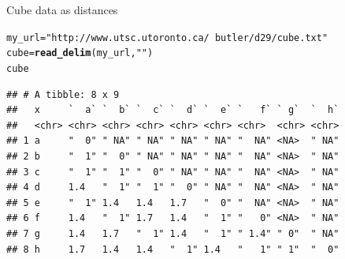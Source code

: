 \documentclass[unknownkeysallowed]{beamer}\usepackage[]{graphicx}\usepackage[]{color}
\makeatletter
\newcommand{\hlnum}[1]{\textcolor[rgb]{0.686,0.059,0.569}{#1}}%
\newcommand{\hlstr}[1]{\textcolor[rgb]{0.192,0.494,0.8}{#1}}%
\newcommand{\hlopt}[1]{\textcolor[rgb]{0,0,0}{#1}}%
\newcommand{\hlstd}[1]{\textcolor[rgb]{0.345,0.345,0.345}{#1}}%
\newcommand{\hlkwb}[1]{\textcolor[rgb]{0.69,0.353,0.396}{#1}}%
\newcommand{\hlkwd}[1]{\textcolor[rgb]{0.737,0.353,0.396}{\textbf{#1}}}%
\newenvironment{kframe}{%
 \def\at@end@of@kframe{}%
 \ifinner\ifhmode%
  \def\at@end@of@kframe{\end{minipage}}%
  \begin{minipage}{\columnwidth}%
 \fi\fi%
 \def\FrameCommand##1{\hskip\@totalleftmargin \hskip-\fboxsep
 \colorbox{shadecolor}{##1}\hskip-\fboxsep
     \hskip-\linewidth \hskip-\@totalleftmargin \hskip\columnwidth}%
 \MakeFramed {\advance\hsize-\width
   \@totalleftmargin\z@ \linewidth\hsize
   \@setminipage}}%
 {\par\unskip\endMakeFramed%
 \at@end@of@kframe}
\newenvironment{knitrout}{}{} %
\makeatother
\begin{document}
\begin{frame}[fragile]{Cube data as distances}
 
\begin{knitrout}\footnotesize
{}\color{fgcolor}\begin{kframe}
\begin{alltt}
\hlstd{my_url}\hlkwb{=}\hlstr{"http://www.utsc.utoronto.ca/~butler/d29/cube.txt"}
\hlstd{cube}\hlkwb{=}\hlkwd{read_delim}\hlstd{(my_url,}\hlstr{" "}\hlstd{)}
\hlstd{cube}
\end{alltt}
\begin{verbatim}
## # A tibble: 8 x 9
##   x     `  a` `  b` `  c` `  d` `  e` `   f` ` g`  `  h`
##   <chr> <chr> <chr> <chr> <chr> <chr> <chr>  <chr> <chr>
## 1 a     "  0" " NA" " NA" " NA" " NA" "  NA" <NA>  " NA"
## 2 b     "  1" "  0" " NA" " NA" " NA" "  NA" <NA>  " NA"
## 3 c     "  1" "  1" "  0" " NA" " NA" "  NA" <NA>  " NA"
## 4 d     1.4   "  1" "  1" "  0" " NA" "  NA" <NA>  " NA"
## 5 e     "  1" 1.4   1.4   1.7   "  0" "  NA" <NA>  " NA"
## 6 f     1.4   "  1" 1.7   1.4   "  1" "   0" <NA>  " NA"
## 7 g     1.4   1.7   "  1" 1.4   "  1" " 1.4" " 0"  " NA"
## 8 h     1.7   1.4   1.4   "  1" 1.4   "   1" " 1"  "  0"
\end{verbatim}
\end{kframe}
\end{knitrout}
  
\end{frame}

\end{document}
